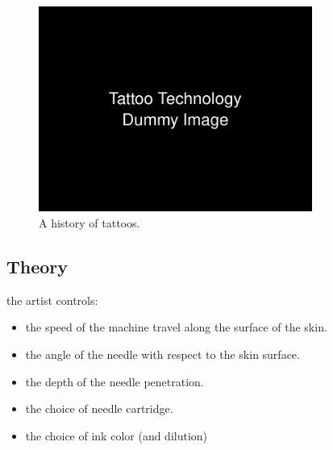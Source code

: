 \documentclass[11pt]{article}
\begin{document}
\begin{figure}[h]
    \centering
    \includegraphics[width=0.8\textwidth]{figures/technology.png}
    \caption{A history of tattoos.}
    \label{fig:timeline}
\end{figure}

\subsection{Theory}

the artist controls:
\begin{itemize}
    \item the speed of the machine travel along the surface of the skin.
    \item the angle of the needle with respect to the skin surface.
    \item the depth of the needle penetration.
    \item the choice of needle cartridge.
    \item the choice of ink color (and dilution)
\end{itemize}
\end{document}
